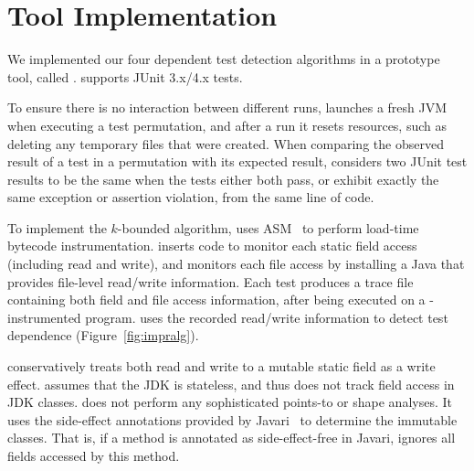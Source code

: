 \section{Tool Implementation}
\label{sec:impl}


We implemented our four dependent test detection algorithms in
a prototype tool, called \ourtool. \ourtool
supports JUnit 3.x/4.x tests. %

To ensure there is no interaction between
different runs, \ourtool launches a fresh JVM
when executing a test permutation, and after a run it resets resources,
such as deleting any temporary files that were created.
When comparing the observed result of
a test in a permutation with its expected result,
\ourtool considers two JUnit test results to be the same when the
tests either both pass, or exhibit exactly the same exception
or assertion violation, from the same line of code.

To implement the \dependenceaware{} $k$-bounded
algorithm, \ourtool uses ASM~\cite{asm} to perform load-time bytecode
instrumentation. \ourtool inserts code to monitor each
static field access (including read and write), and
monitors each file access by
installing a Java  that provides 
file-level read/write information.
Each test produces a trace file containing both
field and file access information, after being executed
on a \ourtool-instrumented program. \ourtool uses
the recorded read/write information to detect
test dependence (Figure~\ref{fig:impralg}).

\ourtool conservatively treats both read
and write to a mutable static field as a write effect.
\ourtool assumes that the JDK is stateless,
and thus does not track field access in JDK classes. 
\ourtool does not perform any sophisticated points-to or shape
analyses. It uses the side-effect annotations
provided by Javari~\cite{QuinonezTE2008} to determine the immutable
classes. That is, if a method is annotated as side-effect-free
in Javari, \ourtool ignores all fields accessed by this method.



